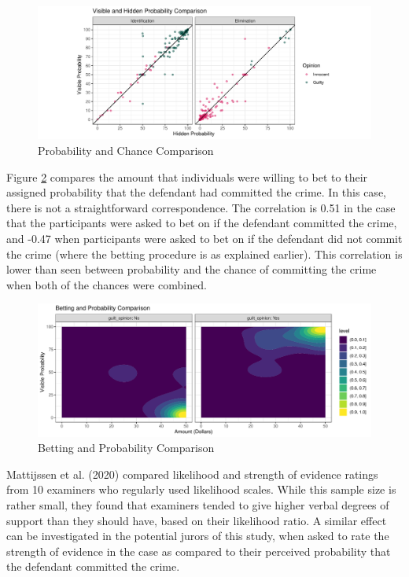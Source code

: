 \documentclass[print]{nuthesis}
\begin{document}
\begin{figure}

{\centering \includegraphics[width=\linewidth]{thesis_files/figure-latex/probcomp-1} 

}

\caption{Probability and Chance Comparison}\label{fig:probcomp}
\end{figure}

Figure \ref{fig:probbet} compares the amount that individuals were willing to bet to their assigned probability that the defendant had committed the crime.
In this case, there is not a straightforward correspondence.
The correlation is 0.51 in the case that the participants were asked to bet on if the defendant committed the crime, and -0.47 when participants were asked to bet on if the defendant did not commit the crime (where the betting procedure is as explained earlier).
This correlation is lower than seen between probability and the chance of committing the crime when both of the chances were combined.

\begin{figure}

{\centering \includegraphics[width=\linewidth]{thesis_files/figure-latex/probbet-1} 

}

\caption{Betting and Probability Comparison}\label{fig:probbet}
\end{figure}

Mattijssen et al. (2020) compared likelihood and strength of evidence ratings from 10 examiners who regularly used likelihood scales.
While this sample size is rather small, they found that examiners tended to give higher verbal degrees of support than they should have, based on their likelihood ratio.
A similar effect can be investigated in the potential jurors of this study, when asked to rate the strength of evidence in the case as compared to their perceived probability that the defendant committed the crime.
\end{document}
